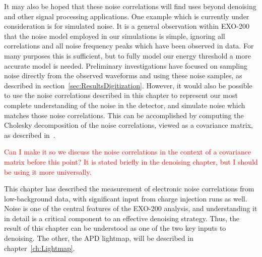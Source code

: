 It may also be hoped that these noise correlations will find uses beyond denoising and other signal processing applications.  One example which is currently under consideration is for simulated noise.  It is a general observation within EXO-200 that the noise model employed in our simulations is simple, ignoring all correlations and all noise frequency peaks which have been observed in data.  For many purposes this is sufficient, but to fully model our energy threshold a more accurate model is needed.  Preliminary investigations have focused on sampling noise directly from the observed waveforms and using these noise samples, as described in section~\ref{sec:ResultsDigitization}.  However, it would also be possible to use the noise correlations described in this chapter to represent our most complete understanding of the noise in the detector, and simulate noise which matches those noise correlations.  This can be accomplished by computing the Cholesky decomposition of the noise correlations, viewed as a covariance matrix, as described in~\cite{ross2012simulation}.

\textcolor{red}{Can I make it so we discuss the noise correlations in the context of a covariance matrix before this point?  It is stated briefly in the denoising chapter, but I should be using it more universally.}

This chapter has described the measurement of electronic noise correlations from low-background data, with significant input from charge injection runs as well.  Noise is one of the central features of the EXO-200 analysis, and understanding it in detail is a critical component to an effective denoising strategy.  Thus, the result of this chapter can be understood as one of the two key inputs to denoising.  The other, the APD lightmap, will be described in chapter~\ref{ch:Lightmap}.
